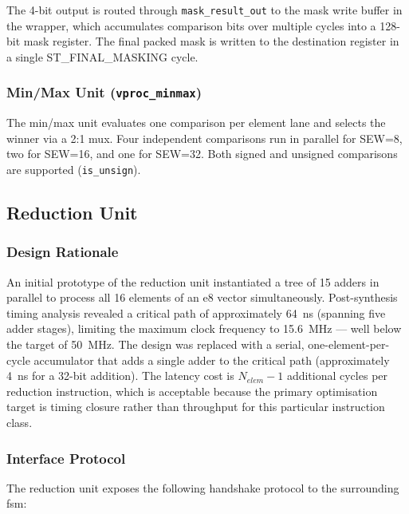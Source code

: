 The 4-bit output is routed through \texttt{mask\_result\_out} to the mask write buffer
in the wrapper, which accumulates comparison bits over multiple cycles into a 128-bit
mask register. The final packed mask is written to the destination register in a single
ST\_FINAL\_MASKING cycle.

\subsubsection{Min/Max Unit (\texttt{vproc\_minmax})}

The min/max unit evaluates one comparison per element lane and selects the winner via a
2:1 mux. Four independent comparisons run in parallel for SEW=8, two for SEW=16, and
one for SEW=32. Both signed and unsigned comparisons are supported (\texttt{is\_unsign}).

\subsection{Reduction Unit}
\label{subsec:reduction}

\subsubsection{Design Rationale}

An initial prototype of the reduction unit instantiated a tree of 15 adders in parallel
to process all 16 elements of an e8 vector simultaneously. Post-synthesis timing
analysis revealed a critical path of approximately 64~ns (spanning five adder stages),
limiting the maximum clock frequency to 15.6~MHz — well below the target of 50~MHz.
The design was replaced with a serial, one-element-per-cycle accumulator that adds a
single adder to the critical path (approximately 4~ns for a 32-bit addition).
The latency cost is $N_{elem} - 1$ additional cycles per reduction instruction, which
is acceptable because the primary optimisation target is timing closure rather than
throughput for this particular instruction class.

\subsubsection{Interface Protocol}

The reduction unit exposes the following handshake protocol to the surrounding \gls{fsm}:

